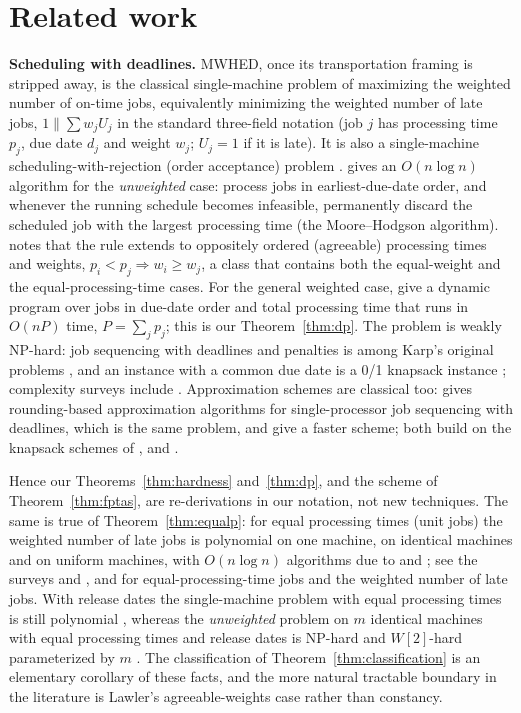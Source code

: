 \documentclass[pdflatex,sn-mathphys-ay]{sn-jnl}
\theoremstyle{thmstyleone}
\theoremstyle{thmstyletwo}
\theoremstyle{thmstylethree}
\begin{document}
\section{Related work}\label{sec:related}

\textbf{Scheduling with deadlines.} MWHED, once its transportation
framing is stripped away, is the classical single-machine problem of
maximizing the weighted number of on-time jobs, equivalently minimizing
the weighted number of late jobs, $1\|\sum w_jU_j$ in the standard
three-field notation (job $j$ has processing time $p_j$, due date $d_j$
and weight $w_j$; $U_j=1$ if it is late). It is also a single-machine
scheduling-with-rejection (order acceptance) problem \citep{shabtay2013}.
\citet{moore1968} gives an $O(n\log n)$ algorithm for the
\emph{unweighted} case: process jobs in earliest-due-date order, and
whenever the running schedule becomes infeasible, permanently discard the
scheduled job with the largest processing time (the Moore--Hodgson
algorithm). \citet{lawler1976} notes that the rule extends to oppositely
ordered (agreeable) processing times and weights,
$p_i<p_j\Rightarrow w_i\ge w_j$, a class that contains both the
equal-weight and the equal-processing-time cases. For the general
weighted case, \citet{lawlermoore1969} give a dynamic program over jobs
in due-date order and total processing time that runs in $O(nP)$ time,
$P=\sum_jp_j$; this is our Theorem~\ref{thm:dp}. The problem is weakly
NP-hard: job sequencing with deadlines and penalties is among Karp's
original problems \citep{karp1972}, and an instance with a common due
date is a 0/1 knapsack instance \citep{gareyjohnson1979}; complexity
surveys include \citet{lenstra1977}. Approximation schemes are classical
too: \citet{sahni1976} gives rounding-based approximation algorithms for
single-processor job sequencing with deadlines, which is the same
problem, and \citet{gensl1981} give a faster scheme; both build on the
knapsack schemes of \citet{ibarrakim1975}, \citet{lawler1979} and
\citet{kellerer1999,kellerer2004}.

Hence our Theorems~\ref{thm:hardness} and~\ref{thm:dp}, and the scheme of
Theorem~\ref{thm:fptas}, are re-derivations in our notation, not new
techniques. The same is true of
Theorem~\ref{thm:equalp}: for equal processing times (unit jobs) the
weighted number of late jobs is polynomial on one machine, on identical
machines and on uniform machines, with $O(n\log n)$ algorithms due to
\citet{lawler1976} and \citet{dessouky1990}; see the surveys
\citet{baptiste2004} and \citet{kravchenkowerner2011}, and
\citet{bruckerkravchenko2006} for equal-processing-time jobs and the
weighted number of late jobs. With release dates the single-machine
problem with equal processing times is still polynomial
\citep{baptiste1999}, whereas the \emph{unweighted} problem on $m$
identical machines with equal processing times and release dates is
NP-hard and $W[2]$-hard parameterized by $m$ \citep{heegermolter2025}. The
classification of Theorem~\ref{thm:classification} is an elementary
corollary of these facts, and the more natural tractable boundary in the
literature is Lawler's agreeable-weights case rather than constancy.
\end{document}
